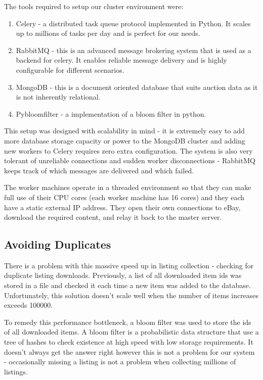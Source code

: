 \documentclass[12pt]{article}
\begin{document}
The tools required to setup our cluster environment were:
\begin{enumerate}
\item Celery - a distributed task queue protocol implemented in Python. It scales up to millions of tasks per day and is perfect for our needs.
\item RabbitMQ - this is an advanced message brokering system that is used as a backend for celery. It enables reliable message delivery and is highly configurable for different scenarios.
\item MongoDB - this is a document oriented database that suits auction data as it is not inherently relational.
\item Pybloomfilter - a implementation of a bloom filter in python.
\end{enumerate}


This setup was designed with scalability in mind - it is extremely easy to add more database storage capacity or power to the MongoDB cluster and adding new workers to Celery requires zero extra configuration. The system is also very tolerant of unreliable connections and sudden worker disconnections - RabbitMQ keeps track of which messages are delivered and which failed.

The worker machines operate in a threaded environment so that they can make full use of their CPU cores (each worker machine has 16 cores) and they each have a static external IP address. They open their own connections to eBay, download the required content, and relay it back to the master server.


\subsection{Avoiding Duplicates}
There is a problem with this massive speed up in listing collection - checking for duplicate listing downloads. Previously, a list of all downloaded item ids was stored in a file and checked it each time a new item was added to the database. Unfortunately, this solution doesn't scale well when the number of items increases exceeds 100000.

To remedy this performance bottleneck, a bloom filter was used to store the ids of all downloaded items. A bloom filter is a probabilistic data structure that use a tree of hashes to check existence at high speed with low storage requirements. It doesn't always get the answer right however this is not a problem for our system - occasionally missing a listing is not a problem when collecting millions of listings.
\end{document}
